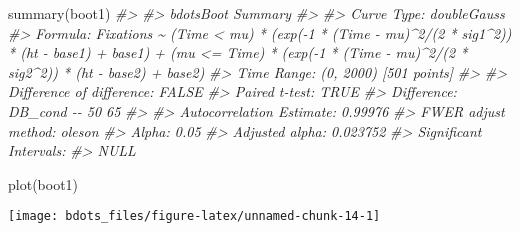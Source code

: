\documentclass[
]{article}
\newenvironment{Shaded}{\begin{snugshade}}{\end{snugshade}}
\newcommand{\CommentTok}[1]{\textcolor[rgb]{0.56,0.35,0.01}{\textit{#1}}}
\newcommand{\FunctionTok}[1]{\textcolor[rgb]{0.00,0.00,0.00}{#1}}
\newcommand{\NormalTok}[1]{#1}
\begin{document}
\begin{Shaded}
\begin{Highlighting}[]
\FunctionTok{summary}\NormalTok{(boot1)}
\CommentTok{\#\textgreater{} }
\CommentTok{\#\textgreater{} bdotsBoot Summary}
\CommentTok{\#\textgreater{} }
\CommentTok{\#\textgreater{} Curve Type: doubleGauss }
\CommentTok{\#\textgreater{} Formula: Fixations \textasciitilde{} (Time \textless{} mu) * (exp({-}1 * (Time {-} mu)\^{}2/(2 * sig1\^{}2)) * (ht {-} base1) + base1) + (mu \textless{}= Time) * (exp({-}1 * (Time {-} mu)\^{}2/(2 * sig2\^{}2)) * (ht {-} base2) + base2) }
\CommentTok{\#\textgreater{} Time Range: (0, 2000) [501 points]}
\CommentTok{\#\textgreater{} }
\CommentTok{\#\textgreater{} Difference of difference: FALSE }
\CommentTok{\#\textgreater{} Paired t{-}test: TRUE }
\CommentTok{\#\textgreater{} Difference: DB\_cond {-}{-} 50 65 }
\CommentTok{\#\textgreater{} }
\CommentTok{\#\textgreater{} Autocorrelation Estimate: 0.99976 }
\CommentTok{\#\textgreater{} FWER adjust method: oleson }
\CommentTok{\#\textgreater{} Alpha: 0.05 }
\CommentTok{\#\textgreater{} Adjusted alpha: 0.023752 }
\CommentTok{\#\textgreater{} Significant Intervals:}
\CommentTok{\#\textgreater{} NULL}

\FunctionTok{plot}\NormalTok{(boot1)}
\end{Highlighting}
\end{Shaded}

\begin{center}\texttt{[image: bdots\_files/figure-latex/unnamed-chunk-14-1]} \end{center}
\end{document}
